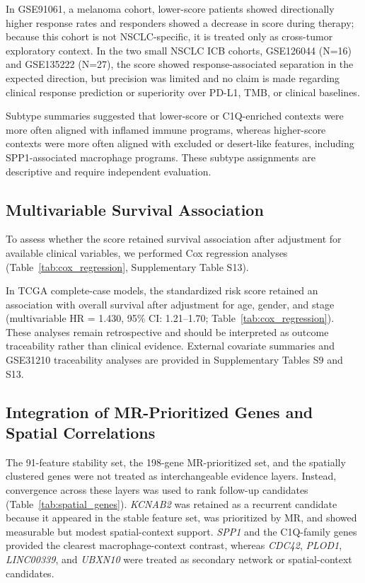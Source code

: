 \documentclass[pdflatex,sn-mathphys-num,referee,lineno]{sn-jnl}
\theoremstyle{thmstyleone}%
\theoremstyle{thmstyletwo}%
\theoremstyle{thmstylethree}%
\begin{document}
In GSE91061, a melanoma cohort, lower-score patients showed directionally higher response rates and responders showed a decrease in score during therapy; because this cohort is not NSCLC-specific, it is treated only as cross-tumor exploratory context. In the two small NSCLC ICB cohorts, GSE126044 (N=16) and GSE135222 (N=27), the score showed response-associated separation in the expected direction, but precision was limited and no claim is made regarding clinical response prediction or superiority over PD-L1, TMB, or clinical baselines.

Subtype summaries suggested that lower-score or C1Q-enriched contexts were more often aligned with inflamed immune programs, whereas higher-score contexts were more often aligned with excluded or desert-like features, including SPP1-associated macrophage programs. These subtype assignments are descriptive and require independent evaluation.

\subsection{Multivariable Survival Association}\label{subsec:res_multi}

To assess whether the score retained survival association after adjustment for available clinical variables, we performed Cox regression analyses (Table~\ref{tab:cox_regression}, Supplementary Table S13).

In TCGA complete-case models, the standardized risk score retained an association with overall survival after adjustment for age, gender, and stage (multivariable HR = 1.430, 95\% CI: 1.21--1.70; Table~\ref{tab:cox_regression}). These analyses remain retrospective and should be interpreted as outcome traceability rather than clinical evidence. External covariate summaries and GSE31210 traceability analyses are provided in Supplementary Tables S9 and S13.

\subsection{Integration of MR-Prioritized Genes and Spatial Correlations}\label{subsec:res_integration}

The 91-feature stability set, the 198-gene MR-prioritized set, and the spatially clustered genes were not treated as interchangeable evidence layers. Instead, convergence across these layers was used to rank follow-up candidates (Table~\ref{tab:spatial_genes}). \textit{KCNAB2} was retained as a recurrent candidate because it appeared in the stable feature set, was prioritized by MR, and showed measurable but modest spatial-context support. \textit{SPP1} and the C1Q-family genes provided the clearest macrophage-context contrast, whereas \textit{CDC42}, \textit{PLOD1}, \textit{LINC00339}, and \textit{UBXN10} were treated as secondary network or spatial-context candidates.
\end{document}
